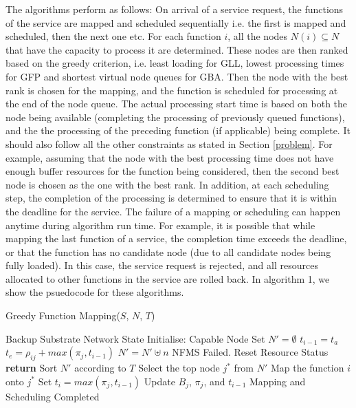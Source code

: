 \documentclass[conference]{IEEEtran}
\begin{document}
\indent The algorithms perform as follows: On arrival of a service request, the functions of the service are mapped and scheduled sequentially i.e. the first is mapped and scheduled, then the next one etc. For each function $i$, all the nodes $N(i) \subseteq N$ that have the capacity to process it are determined. These nodes are then ranked based on the greedy criterion, i.e. least loading for GLL, lowest processing times for GFP and shortest virtual node queues for GBA. Then the node with the best rank is chosen for the mapping, and the function is scheduled for processing at the end of the node queue. The actual processing start time is based on both the node being available (completing the processing of previously queued functions), and the the processing of the preceding function (if applicable) being complete. It should also follow all the other constraints as stated in Section \ref{problem}. For example, assuming that the node with the best processing time does not have enough buffer resources for the function being considered, then the second best node is chosen as the one with the best rank. In addition, at each scheduling step, the completion of the processing is determined to ensure that it is within the deadline for the service. The failure of a mapping or scheduling can happen anytime during algorithm run time. For example, it is possible that while mapping the last function of a service, the completion time exceeds the deadline, or that the function has no candidate node (due to all candidate nodes being fully loaded). In this case, the service request is rejected, and all resources allocated to other functions in the service are rolled back. In algorithm 1, we show the psuedocode for these algorithms.
\begin{algorithm}[t]
\caption{Greedy Function Mapping($S$, $N$, $T$)}
\label{greedy}
\begin{algorithmic}[1]
\STATE Backup Substrate Network State
\STATE Initialise: Capable Node Set $N' = \emptyset$
\STATE $t_{i-1} = t_a$
\ENDIF
{}	
\STATE $t_e = \rho_{ij} + max (\pi_{j} , t_{i-1})$	
\STATE $N' = N' \uplus n$
\ENDIF
\ENDFOR
{}
\STATE NFMS Failed. Reset Resource Status
\STATE \textbf{return}
\ENDIF
\STATE Sort $N'$ according to $T$
\STATE Select the top node $j^*$ from $N'$
\STATE Map the function $i$ onto $j^*$
\STATE Set $t_i = max (\pi_{j} , t_{i-1})$
\STATE Update $B_j$, $\pi_{j}$, and $t_{i-1}$
\ENDFOR
\STATE Mapping and Scheduling Completed
\end{algorithmic}
\end{algorithm}
\end{document}
